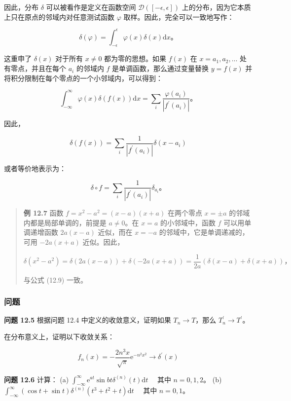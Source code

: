 因此，分布 \(\delta\) 可以被看作是定义在函数空间
\(\mathcal{D}([-\epsilon, \epsilon])\)
上的分布，因为它本质上只在原点的邻域内对任意测试函数 \(\varphi\)
取样。因此，完全可以一致地写作：

\[
\delta(\varphi) = \int_{-\epsilon}^\epsilon \varphi(x) \delta(x) \mathrm{d}x。
\]

这重申了 \(\delta(x)\) 对于所有 \(x \neq 0\) 都为零的思想。如果 \(f(x)\)
在 \(x = a_1, a_2, \ldots\) 处有零点，并且在每个 \(a_i\) 的邻域内 \(f\)
是单调函数，那么通过变量替换 \(y = f(x)\)
并将积分限制在每个零点的一个小邻域内，可以得到：

\[
\int_{-\infty}^\infty \varphi(x) \delta(f(x)) \mathrm{d}x = \sum_{i} \frac{\varphi(a_i)}{\left|f^{\prime}(a_i)\right|}。
\]

因此，

\[
\delta(f(x)) = \sum_{i} \frac{1}{\left|f^{\prime}(a_i)\right|} \delta(x - a_i)
\]

或者等价地表示为：

\[
\delta \circ f = \sum_{i} \frac{1}{\left|f^{\prime}(a_i)\right|} \delta_{a_i}。
\]

\begin{quote}
\textbf{例 12.7} 函数 \(f = x^2 - a^2 = (x - a)(x + a)\) 在两个零点
\(x = \pm a\) 的邻域内都是局部单调的，前提是 \(a \neq 0\)。在 \(x = a\)
的小邻域中，函数 \(f\) 可以用单调递增函数 \(2a(x - a)\) 近似，而在
\(x = -a\) 的邻域中，它是单调递减的，可用 \(-2a(x + a)\) 近似。因此，

\[\delta(x^2 - a^2) = \delta(2a(x - a)) + \delta(-2a(x + a)) = \frac{1}{2a}(\delta(x - a) + \delta(x + a))，\]

与公式 (12.9) 一致。
\end{quote}

\subsubsection{问题}\label{ux95eeux9898-1}

\textbf{问题 12.5} 根据问题 12.4 中定义的收敛意义，证明如果
\(T_n \rightarrow T\)，那么 \(T_n^{\prime} \rightarrow T^{\prime}\)。

在分布意义上，证明以下收敛关系：

\[
f_n(x) = -\frac{2 n^3 x}{\sqrt{\pi}} \mathrm{e}^{-n^2 x^2} \rightarrow \delta^{\prime}(x)
\]

\textbf{问题 12.6} 计算： (a)
\(\int_{-\infty}^\infty \mathrm{e}^{a t} \sin b t \delta^{(n)}(t) \mathrm{d}t \quad\)
其中 \(n=0,1,2\)。 (b)
\(\int_{-\infty}^\infty (\cos t + \sin t) \delta^{(n)}\left(t^3 + t^2 + t\right) \mathrm{d}t \quad\)
其中 \(n=0,1\)。

